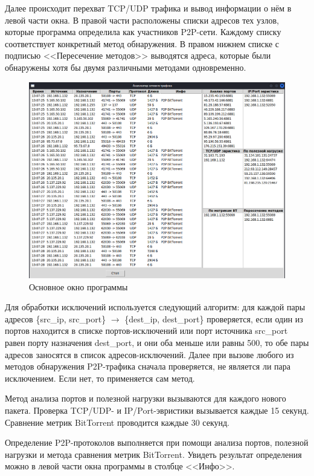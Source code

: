 \documentclass[bachelor, och, coursework]{SCWorks}
\begin{document}
Далее происходит перехват TCP/UDP трафика и вывод информации о нём в левой части окна. В правой части расположены списки адресов тех узлов, которые программа определила как участников P2P-сети. Каждому списку соответствует конкретный метод обнаружения. В правом нижнем списке с подписью <<Пересечение методов>> выводятся адреса, которые были обнаружены хотя бы двумя различными методами одновременно.

\begin{figure}[H]
    \centering
    \includegraphics[width=1\textwidth]{window.png}
    \caption{Основное окно программы}
\end{figure}

Для обработки исключений используется следующий алгоритм: для каждой пары адресов \{src_ip, src_port\} $\to$ \{dest_ip, dest_port\} проверяется, если один из портов находится в списке портов-исключений или порт источника src_port равен порту назначения dest_port, и они оба меньше или равны 500, то обе пары адресов заносятся в список адресов-исключений. Далее при вызове любого из методов обнаружения P2P-трафика сначала проверяется, не является ли пара исключением. Если нет, то применяется сам метод.

Метод анализа портов и полезной нагрузки вызываются для каждого нового пакета. Проверка TCP/UDP- и IP/Port-эвристики вызывается каждые 15 секунд. Сравнение метрик BitTorrent проводится каждые 30 секунд.

Определение P2P-протоколов выполняется при помощи анализа портов, полезной нагрузки и метода сравнения метрик BitTorrent. Увидеть результат определения можно в левой части окна программы в столбце <<Инфо>>.
\end{document}
